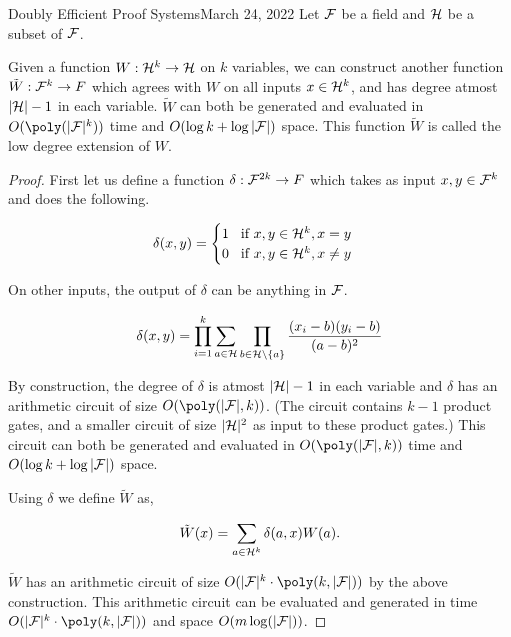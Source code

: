 \begin{lecture}{9}{Doubly Efficient Proof Systems}{March 24, 2022}
Let $\mathcal{F}$ be a field and $\mathcal{H}$ be a subset of $\mathcal{F}$. 

\begin{lemma}\label{lem:lde}
Given a function $W:\mathcal{H}^k \rightarrow \mathcal{H}$ on $k$ variables, we can construct another function $\tilde{W}:\mathcal{F}^k \rightarrow F$ which agrees with $W$ on all inputs $x \in \mathcal{H}^k$, and has degree atmost $|\mathcal{H}|-1$ in each variable. $\tilde{W}$ can both be generated and evaluated in $O(\poly(|\F|^k))$ time and $O(\log k + \log |\mathcal{F}|)$ space. This function $\tilde{W}$ is called the low degree extension of $W$. 
\end{lemma}

\begin{proof}
	
First let us define a function $\delta:\mathcal{F}^{2k} \rightarrow F$ which takes as input $x, y \in \mathcal{F}^k$ and does the following.

\[
\delta(x,y) = \begin{cases}
1 \hspace{3mm} \textrm{if $x, y \in \mathcal{H}^k, x=y$} \\
0 \hspace{3mm} \textrm{if $x, y \in \mathcal{H}^k, x \neq y$} 
\end{cases}
\]

On other inputs, the output of $\delta$ can be anything in $\mathcal{F}$.
	
\begin{equation}
\delta(x,y) = \prod_{i=1}^k \sum_{a \in \mathcal{H}} \prod_{b \in \mathcal{H}\setminus\{a\}} \frac{(x_i-b)(y_i-b)}{(a-b)^2}
\end{equation}

By construction, the degree of $\delta$ is atmost $|\mathcal{H}|-1$ in each variable and $\delta$ has an arithmetic circuit of size $O(\poly(|\F|, k))$. (The circuit contains $k-1$ product gates, and a smaller circuit of size $|\mathcal{H}|^2$ as input to these product gates.) This circuit can both be generated and evaluated in $O(\poly(|\F|, k))$ time and $O(\log k + \log |\mathcal{F}|)$ space. 

Using $\delta$ we define $\tilde{W}$ as,
	
	\begin{equation*}
	\tilde{W}(x) = \sum_{a \in \mathcal{H}^k} \delta(a,x) W(a). 
	\end{equation*}
	
$\tilde{W}$ has an arithmetic circuit of size $O(|\F|^k \cdot \poly(k , |\F|))$ by the above construction. This arithmetic circuit can be evaluated and generated in time $O(|\F|^k \cdot \poly(k , |\F|))$ and space $O(m \log (|\mathcal{F}|))$.


\end{proof}
\end{lecture}
